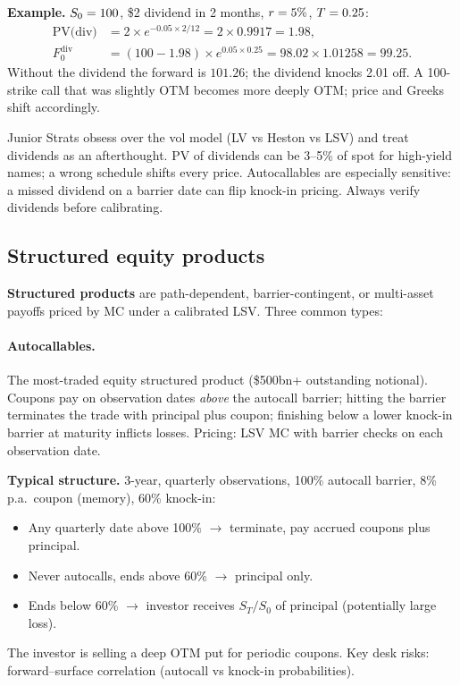 \noindent
\textbf{Example.} $S_0=100$, \$2 dividend in 2 months, $r=5\%$,
$T=0.25$:
\begin{align*}
  \text{PV(div)} &= 2 \times e^{-0.05 \times 2/12} = 2 \times 0.9917 = 1.98, \\
  F_0^{\text{div}} &= (100 - 1.98) \times e^{0.05 \times 0.25} = 98.02 \times 1.01258 = 99.25.
\end{align*}
Without the dividend the forward is $101.26$; the dividend knocks
2.01 off. A 100-strike call that was slightly OTM becomes more deeply
OTM; price and Greeks shift accordingly.

\begin{pitfallbox}
Junior Strats obsess over the vol model (LV vs Heston vs LSV) and
treat dividends as an afterthought. PV of dividends can be 3--5\% of
spot for high-yield names; a wrong schedule shifts every price.
Autocallables are especially sensitive: a missed dividend on a
barrier date can flip knock-in pricing. Always verify dividends
before calibrating.
\end{pitfallbox}

\subsection{Structured equity products}
\label{subsec:structured_products}

\textbf{Structured products} are path-dependent, barrier-contingent, or
multi-asset payoffs priced by MC under a calibrated LSV. Three common
types:

\paragraph{Autocallables.}
The most-traded equity structured product (\$500bn+ outstanding
notional). Coupons pay on observation dates \emph{above} the autocall
barrier; hitting the barrier terminates the trade with principal plus
coupon; finishing below a lower knock-in barrier at maturity inflicts
losses. Pricing: LSV MC with barrier checks on each observation date.

\noindent
\textbf{Typical structure.} 3-year, quarterly observations, 100\%
autocall barrier, 8\% p.a.\ coupon (memory), 60\% knock-in:
\begin{itemize}
  \item Any quarterly date above 100\% $\to$ terminate, pay accrued
    coupons plus principal.
  \item Never autocalls, ends above 60\% $\to$ principal only.
  \item Ends below 60\% $\to$ investor receives $S_T/S_0$ of principal
    (potentially large loss).
\end{itemize}
The investor is selling a deep OTM put for periodic coupons. Key
desk risks: forward--surface correlation (autocall vs knock-in
probabilities).

